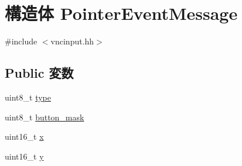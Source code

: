\hypertarget{structVncInput_1_1PointerEventMessage}{
\section{構造体 PointerEventMessage}
\label{structVncInput_1_1PointerEventMessage}
}


{\ttfamily \#include $<$vncinput.hh$>$}\subsection*{Public 変数}
\begin{DoxyCompactItemize}
\item 
uint8\_\-t \hyperlink{structVncInput_1_1PointerEventMessage_a1d127017fb298b889f4ba24752d08b8e}{type}
\item 
uint8\_\-t \hyperlink{structVncInput_1_1PointerEventMessage_a2027ef457ba027a1b76be724a77676c7}{button\_\-mask}
\item 
uint16\_\-t \hyperlink{structVncInput_1_1PointerEventMessage_a4dde988b1b2adba65ae3efa69f65d960}{x}
\item 
uint16\_\-t \hyperlink{structVncInput_1_1PointerEventMessage_ab0580f504a7428539be299fa71565f30}{y}
\end{DoxyCompactItemize}


